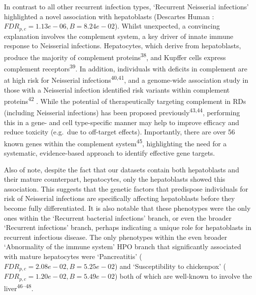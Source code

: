 \documentclass[
sn-nature
]{sn-jnl}
\begin{document}
In contrast to all other recurrent infection types, `Recurrent
Neisserial infections' highlighted a novel association with hepatoblasts
(Descartes Human : \(FDR_{p,c}= 1.13e-06,B= 8.24e-02\)). Whilst
unexpected, a convincing explanation involves the complement system, a
key driver of innate immune response to Neisserial infections.
Hepatocytes, which derive from hepatoblasts, produce the majority of
complement proteins\textsuperscript{38}, and Kupffer cells express
complement receptors\textsuperscript{39}. In addition, individuals with
deficits in complement are at high risk for Neisserial
infections\textsuperscript{40,41}, and a genome-wide association study
in those with a Neisserial infection identified risk variants within
complement proteins\textsuperscript{42} . While the potential of
therapeutically targeting complement in RDs (including Neisserial
infections) has been proposed previously\textsuperscript{43,44},
performing this in a gene- and cell type-specific manner may help to
improve efficacy and reduce toxicity (e.g.~due to off-target effects).
Importantly, there are over 56 known genes within the complement
system\textsuperscript{45}, highlighting the need for a systematic,
evidence-based approach to identify effective gene targets.

Also of note, despite the fact that our datasets contain both
hepatoblasts and their mature counterpart, hepatocytes, only the
hepatoblasts showed this association. This suggests that the genetic
factors that predispose individuals for risk of Neisserial infections
are specifically affecting hepatoblasts before they become fully
differentiated. It is also notable that these phenotypes were the only
ones within the `Recurrent bacterial infections' branch, or even the
broader `Recurrent infections' branch, perhaps indicating a unique role
for hepatoblasts in recurrent infectious disease. The only phenotypes
within the even broader `Abnormality of the immune system' HPO branch
that significantly associated with mature hepatocytes were
`Pancreatitis' (\(FDR_{p,c}= 2.08e-02,B= 5.25e-02\)) and `Susceptibility
to chickenpox' (\(FDR_{p,c}= 1.20e-02,B= 5.49e-02\)) both of which are
well-known to involve the liver\textsuperscript{46--48}.
\end{document}
